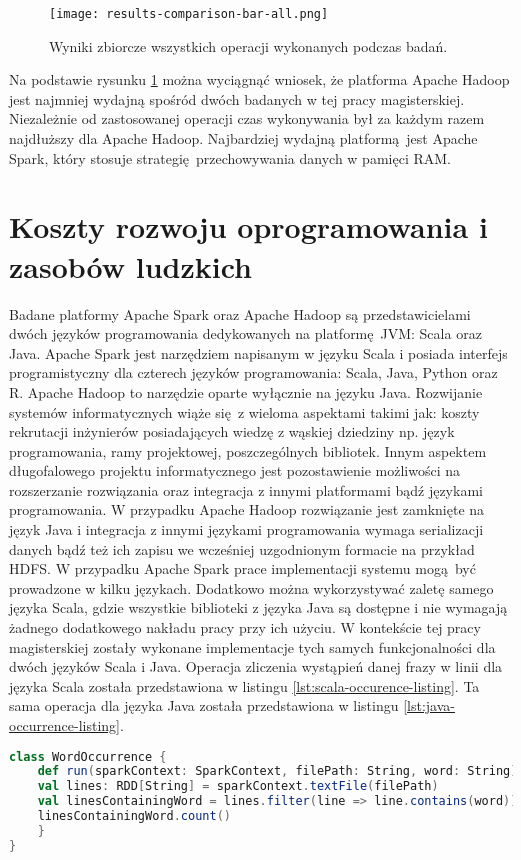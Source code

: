 \begin{figure}[!htb]
	\centering
	\texttt{[image: results-comparison-bar-all.png]}
	\caption{Wyniki zbiorcze wszystkich operacji wykonanych podczas badań.}
	\label{fig:results-comparison-bar-all}
\end{figure}
Na podstawie rysunku \ref{fig:results-comparison-bar-all} można wyciągnąć wniosek, że platforma Apache Hadoop jest najmniej wydajną spośród dwóch badanych w tej pracy magisterskiej. Niezależnie od zastosowanej operacji czas wykonywania był za każdym razem najdłuższy dla Apache Hadoop. Najbardziej wydajną platformą jest Apache Spark, który stosuje strategię przechowywania danych w pamięci RAM.    
\section{Koszty rozwoju oprogramowania i zasobów ludzkich}\label{development_human_resources}
Badane platformy Apache Spark oraz Apache Hadoop są przedstawicielami dwóch języków programowania dedykowanych na platformę JVM: Scala oraz Java. Apache Spark jest narzędziem napisanym w języku Scala i posiada interfejs programistyczny dla czterech języków programowania: Scala, Java, Python oraz R. Apache Hadoop to narzędzie oparte wyłącznie na języku Java. Rozwijanie systemów informatycznych wiąże się z wieloma aspektami takimi jak: koszty rekrutacji inżynierów posiadających wiedzę z wąskiej dziedziny np. język programowania, ramy projektowej, poszczególnych bibliotek. Innym aspektem długofalowego projektu informatycznego jest pozostawienie możliwości na rozszerzanie rozwiązania oraz integracja z innymi platformami bądź językami programowania. W przypadku Apache Hadoop rozwiązanie jest zamknięte na język Java i integracja z innymi językami programowania wymaga serializacji danych bądź też ich zapisu we wcześniej uzgodnionym formacie na przykład HDFS. W przypadku Apache Spark prace implementacji systemu mogą być prowadzone w kilku językach. Dodatkowo można wykorzystywać zaletę samego języka Scala, gdzie wszystkie biblioteki z języka Java są dostępne i nie wymagają żadnego dodatkowego nakładu pracy przy ich użyciu. W kontekście tej pracy magisterskiej zostały wykonane implementacje tych samych funkcjonalności dla dwóch języków Scala i Java. Operacja zliczenia wystąpień danej frazy w linii dla języka Scala została przedstawiona w listingu \ref{lst:scala-occurence-listing}. Ta sama operacja dla języka Java została przedstawiona w listingu \ref{lst:java-occurrence-listing}.
\begin{lstlisting}[language=scala, caption={Operacja zliczania wystąpień danej frazy w linii dla języka Scala na platformie Apache Spark},captionpos=b, label={lst:scala-occurence-listing}]
class WordOccurrence {
	def run(sparkContext: SparkContext, filePath: String, word: String) = {
	val lines: RDD[String] = sparkContext.textFile(filePath)
	val linesContainingWord = lines.filter(line => line.contains(word))
	linesContainingWord.count()
	}
}
\end{lstlisting}
